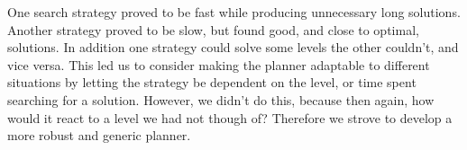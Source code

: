 \documentclass[Main]{subfiles}
\begin{document}
One search strategy proved to be fast while producing unnecessary long solutions. Another strategy proved to be slow, but found good, and close to optimal, solutions. In addition one strategy could solve some levels the other couldn't, and vice versa. This led us to consider making the planner adaptable to different situations by letting the strategy be dependent on the level, or time spent searching for a solution. However, we didn't do this, because then again, how would it react to a level we had not though of? Therefore we strove to develop a more robust and generic planner. 
\end{document}
